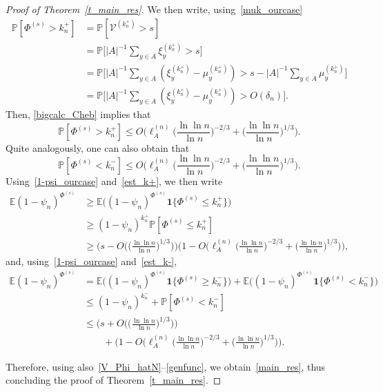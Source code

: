 \documentclass[10pt]{amsart}
\theoremstyle{definition}\newtheorem{defi}[theo]{Definition}\newtheorem{rema}[theo]{Remark}\newtheorem{exam}[theo]{Example}\newtheorem{exem}[theo]{Example}\newtheorem{nota}[theo]{Notation}
\newcommand{\1}[1]{{\mathbf 1}{\{#1\}}}
\newcommand{\V}{{\mathcal V}}
\newcommand{\8}{{\infty}}
\newcommand{\IP}{{\mathbb P}}
\newcommand{\IE}{{\mathbb E}}
\begin{document}
\begin{proof}[Proof of Theorem~\ref{t_main_res}]
We then write, using~\eqref{muk_ourcase}
\begin{align}
\IP[\Phi^{(s)} > k_n^{+}] &= \IP[\V^{(k_n^{+})}>s]\nonumber\\
&= \IP\Big[|A|^{-1}\sum_{y\in A}\xi_y^{(k_n^{+})}> s\Big]\nonumber\\
&= \IP\Big[|A|^{-1}\sum_{y\in A}(\xi_y^{(k_n^{+})} -\mu_y^{(k_n^{+})})> s - |A|^{-1}\sum_{y\in A}\mu_y^{(k_n^{+})}\Big]\nonumber\\
&= \IP\Big[|A|^{-1}\sum_{y\in A}(\xi_y^{(k_n^{+})} -\mu_y^{(k_n^{+})})> O(\delta_n)
\Big].\label{Cheb+}
\end{align}
Then, \eqref{bigcalc_Cheb} implies that
\begin{equation}\label{est_k+}
\IP[\Phi^{(s)} > k_n^{+}]
\leq O\Big(\ell^{(n)}_A\Big(\frac{\ln\ln n}{\ln n}\Big)^{-2/3} + \Big(\frac{\ln\ln n}{\ln n}\Big)^{1/3} \Big).
\end{equation}
Quite analogously, one can also obtain that
\begin{equation}\label{est_k-}
\IP[\Phi^{(s)} < k_n^{-}]
\leq O\Big(\ell^{(n)}_A\Big(\frac{\ln\ln n}{\ln n}\Big)^{-2/3} + \Big(\frac{\ln\ln n}{\ln n}\Big)^{1/3} \Big).
\end{equation}
Using~\eqref{1-psi_ourcase} and~\eqref{est_k+}, we then write
\begin{align}
\IE (1-\psi_n)^{\Phi^{(s)}} &\geq
\IE \big((1-\psi_n)^{\Phi^{(s)}}\1{\Phi^{(s)} \leq k_n^{+}}\big)
\nonumber\\
&\geq (1-\psi_n)^{k_n^{+}}
\IP[\Phi^{(s)} \leq k_n^{+}]\nonumber\\
&\geq \Big(s-O\Big(\Big(\frac{\ln\ln n}{\ln n}\Big)^{1/3}\Big)\Big)
\Big(1-O\Big(\ell^{(n)}_A\Big(\frac{\ln\ln n}{\ln n}\Big)^{-2/3} + \Big(\frac{\ln\ln n}{\ln n}\Big)^{1/3} \Big)\Big),\label{bigest>}
\end{align}
and, using~\eqref{1-psi_ourcase} and~\eqref{est_k-},
\begin{align}
\IE (1-\psi_n)^{\Phi^{(s)}} &=
\IE \big((1-\psi_n)^{\Phi^{(s)}}\1{\Phi^{(s)} \geq k_n^{-}}\big) + \IE \big((1-\psi_n)^{\Phi^{(s)}}\1{\Phi^{(s)} < k_n^{-}}\big)
\nonumber\\
&\leq (1-\psi_n)^{k_n^{-}} + \IP[\Phi^{(s)} < k_n^{-}]
\nonumber\\
&\leq \Big(s+O\Big(\Big(\frac{\ln\ln n}{\ln n}\Big)^{1/3}\Big)\Big)
\nonumber\\
& \qquad +
\Big(1-O\Big(\ell^{(n)}_A\Big(\frac{\ln\ln n}{\ln n}\Big)^{-2/3} + \Big(\frac{\ln\ln n}{\ln n}\Big)^{1/3} \Big)\Big).\label{bigest<}
\end{align}


Therefore, using also~\eqref{V_Phi_hatN}--\eqref{genfunc}, we obtain~\eqref{main_res}, thus concluding the proof of Theorem~\ref{t_main_res}.
\end{proof}
\end{document}
